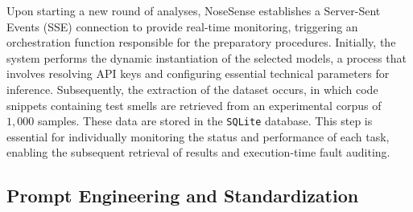 \documentclass[sigconf]{acmart}
\begin{document}
Upon starting a new round of analyses, NoseSense establishes a Server-Sent Events (SSE) connection to provide real-time monitoring, triggering an orchestration function responsible for the preparatory procedures. Initially, the system performs the dynamic instantiation of the selected models, a process that involves resolving API keys and configuring essential technical parameters for inference.
Subsequently, the extraction of the {dataset} occurs, in which code snippets containing {test smells} are retrieved from an experimental {corpus} of $1,000$ samples. These data are stored in the \texttt{SQLite} database. This step is essential for individually monitoring the {status} and {performance} of each task, enabling the subsequent retrieval of results and execution-time fault auditing.

\subsection{Prompt Engineering and Standardization}
\label{sec:prompt_engineering}
\end{document}
